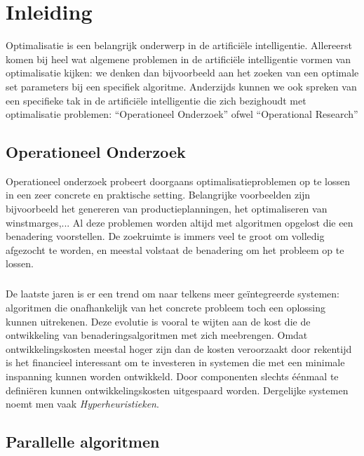 \chapter{Inleiding}

Optimalisatie is een belangrijk onderwerp in de artifici\"ele intelligentie. Allereerst komen bij heel wat algemene problemen in de artifici\"ele intelligentie vormen van optimalisatie kijken: we denken dan bijvoorbeeld aan het zoeken van een optimale set parameters bij een specifiek algoritme. Anderzijds kunnen we ook spreken van een specifieke tak in de artifici\"ele intelligentie die zich bezighoudt met optimalisatie problemen: ``Operationeel Onderzoek'' ofwel ``Operational Research''

\section{Operationeel Onderzoek}

Operationeel onderzoek probeert doorgaans optimalisatieproblemen op te lossen in een zeer concrete en praktische setting. Belangrijke voorbeelden zijn bijvoorbeeld het genereren van productieplanningen, het optimaliseren van winstmarges,... Al deze problemen worden altijd met algoritmen opgelost die een benadering voorstellen. De zoekruimte is immers veel te groot om volledig afgezocht te worden, en meestal volstaat de benadering om het probleem op te lossen.

\paragraph{}
De laatste jaren is er een trend om naar telkens meer ge\"integreerde systemen: algoritmen die onafhankelijk van het concrete probleem toch een oplossing kunnen uitrekenen. Deze evolutie is vooral te wijten aan de kost die de ontwikkeling van benaderingsalgoritmen met zich meebrengen. Omdat ontwikkelingskosten meestal hoger zijn dan de kosten veroorzaakt door rekentijd is het financieel interessant om te investeren in systemen die met een minimale inspanning kunnen worden ontwikkeld. Door componenten slechts \'e\'enmaal te defini\"eren kunnen ontwikkelingskosten uitgespaard worden. Dergelijke systemen noemt men vaak \emph{Hyperheuristieken}.

\section{Parallelle algoritmen}


